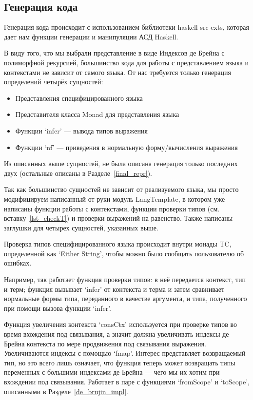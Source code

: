\subsection{Генерация кода}
Генерация кода происходит с использованием библиотеки haskell-src-exts\cite{src_exts}, которая дает нам функции генерации и манипуляции АСД Haskell.

В виду того, что мы выбрали представление в виде Индексов де Брейна с полиморфной рекурсией, большинство кода для работы с представлением языка и контекстами не зависит от самого языка. От нас требуется только генерация определений четырёх сущностей:

\begin{itemize}
\item Представления специфицированного языка
\item Представителя класса Monad для представления языка
\item Функции `infer' --- вывода типов выражения
\item Функции `nf' --- приведения в нормальную форму/вычисления выражения
\end{itemize}

Из описанных выше сущностей, не была описана генерация только последних двух (остальные описаны в Разделе~\ref{final_repr}).

Так как большинство сущностей не зависит от реализуемого языка, мы просто модифицируем написанный от руки модуль LangTemplate, в котором уже написаны функции работы с контекстами, функции проверки типов (см. вставку~\ref{lst_checkT}) и проверки выражений на равенство. Также написаны заглушки для четырех сущностей, указанных выше.

Проверка типов специфицированного языка происходит внутри монады TC, определенной как `Either String', чтобы можно было сообщать пользователю об ошибках.

Например, так работает функция проверки типов: в неё передается контекст, тип и терм; функция вызывает `infer' от контекста и терма и затем сравнивает нормальные формы типа, переданного в качестве аргумента, и типа, полученного при помощи вызова функции `infer'.

Функция увеличения контекста `consCtx' используется при проверке типов во время вхождения под связывания, а значит должна увеличивать индексы де Брейна контекста по мере продвижения под связывания выражения. Увеличиваются индексы с помощью `fmap'. Интерес представляет возвращаемый тип, но это всего лишь означает, что функция теперь может возвращать типы переменных с большими индексами де Брейна --- чего мы их хотим при вхождении под связывания. Работает в паре с функциями `fromScope' и `toScope', описанными в Разделе~\ref{de_brujin_impl}.

